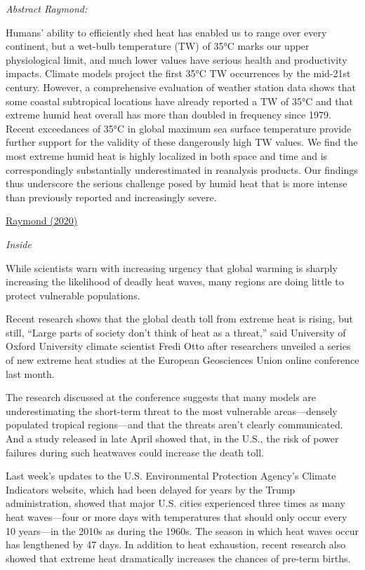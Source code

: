 \documentclass[
]{book}
\begin{document}
\emph{Abstract Raymond:}

Humans' ability to efficiently shed heat has enabled us to range over every continent,
but a wet-bulb temperature (TW) of 35°C marks our upper physiological limit,
and much lower values have serious health and productivity impacts.
Climate models project the first 35°C TW occurrences by the mid-21st century.
However, a comprehensive evaluation of weather station data shows that
some coastal subtropical locations have already reported a TW of 35°C and
that extreme humid heat overall has more than doubled in frequency since 1979.
Recent exceedances of 35°C in global maximum sea surface temperature provide further
support for the validity of these dangerously high TW values.
We find the most extreme humid heat is highly localized in both space and time and
is correspondingly substantially underestimated in reanalysis products.
Our findings thus underscore the serious challenge posed by humid heat
that is more intense than previously reported and increasingly severe.

\href{https://advances.sciencemag.org/content/6/19/eaaw1838}{Raymond (2020)}

\emph{Inside}

While scientists warn with increasing urgency that global warming is sharply increasing the likelihood of deadly heat waves, many regions are doing little to protect vulnerable populations.

Recent research shows that the global death toll from extreme heat is rising, but still, ``Large parts of society don't think of heat as a threat,'' said University of Oxford University climate scientist Fredi Otto after researchers unveiled a series of new extreme heat studies at the European Geosciences Union online conference last month.

The research discussed at the conference suggests that many models are underestimating the short-term threat to the most vulnerable areas---densely populated tropical regions---and that the threats aren't clearly communicated. And a study released in late April showed that, in the U.S., the risk of power failures during such heatwaves could increase the death toll.

Last week's updates to the U.S. Environmental Protection Agency's Climate Indicators website, which had been delayed for years by the Trump administration, showed that major U.S. cities experienced three times as many heat waves---four or more days with temperatures that should only occur every 10 years---in the 2010s as during the 1960s. The season in which heat waves occur has lengthened by 47 days. In addition to heat exhaustion, recent research also showed that extreme heat dramatically increases the chances of pre-term births.
\end{document}
